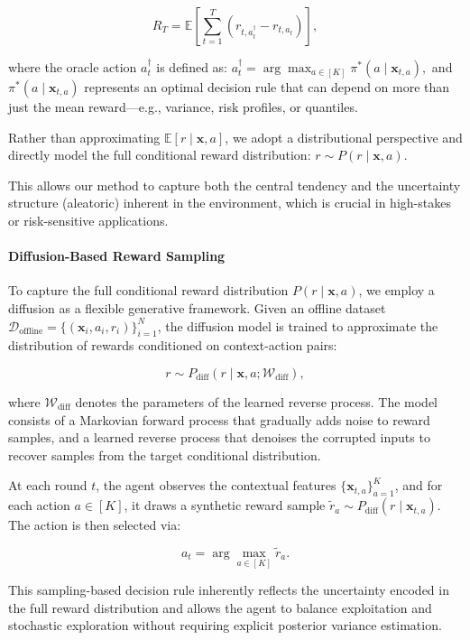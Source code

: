 $$
R_T = \mathbb{E}\left[\sum_{t=1}^T \left( r_{t,a_t^\dagger} - r_{t,a_t} \right)\right],
$$

where the oracle action $a_t^\dagger$ is defined as:
$
a_t^\dagger = \arg\max_{a \in [K]} \pi^*(a \mid \mathbf{x}_{t,a}), 
$
and $\pi^*(a \mid \mathbf{x}_{t,a})$ represents an optimal decision rule that can depend on more than just the mean reward—e.g., variance, risk profiles, or quantiles.

Rather than approximating $\mathbb{E}[r \mid \mathbf{x}, a]$, we adopt a distributional perspective and directly model the full conditional reward distribution:
$
r \sim P(r \mid \mathbf{x}, a). 
$

This allows our method to capture both the central tendency and the uncertainty structure (aleatoric) inherent in the environment, which is crucial in high-stakes or risk-sensitive applications.

\paragraph{Diffusion-Based Reward Sampling}
To capture the full conditional reward distribution $P(r \mid \mathbf{x}, a)$, we employ a diffusion as a flexible generative framework. Given an offline dataset $\mathcal{D}_{\text{offline}} = \{(\mathbf{x}_i, a_i, r_i)\}_{i=1}^N$, the diffusion model is trained to approximate the distribution of rewards conditioned on context-action pairs:

$$
r \sim P_{\text{diff}}(r \mid \mathbf{x}, a; \mathcal{W}_{\text{diff}}), 
$$

where $\mathcal{W}_{\text{diff}}$ denotes the parameters of the learned reverse process. The model consists of a Markovian forward process that gradually adds noise to reward samples, and a learned reverse process that denoises the corrupted inputs to recover samples from the target conditional distribution.

At each round $t$, the agent observes the contextual features $\{\mathbf{x}_{t,a}\}_{a=1}^K$, and for each action $a \in [K]$, it draws a synthetic reward sample $\tilde{r}_a \sim P_{\text{diff}}(r \mid \mathbf{x}_{t,a})$. The action is then selected via:

$$
a_t = \arg\max_{a \in [K]} \tilde{r}_a. 
$$

This sampling-based decision rule inherently reflects the uncertainty encoded in the full reward distribution and allows the agent to balance exploitation and stochastic exploration without requiring explicit posterior variance estimation.

